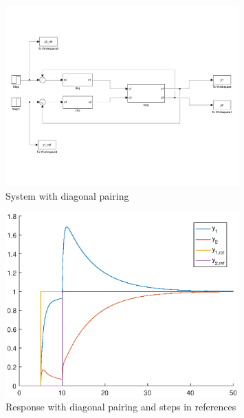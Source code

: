 \documentclass[a4paper]{scrartcl}
\begin{document}
\begin{figure}[ht!]
	\centering
	\includegraphics[width=0.8\textwidth]{fig/sys_diag_pair.pdf}
	\caption{System with diagonal pairing}
	\label{fig:sys_diag_pair}
\end{figure}
\begin{figure}[ht!]
	\centering
	\includegraphics[width=0.8\textwidth]{fig/resp_diagonalpairing_stable.eps}
	\caption{Response with diagonal pairing and steps in references}
	\label{fig:resp_diagonal}
\end{figure}

\end{document}
